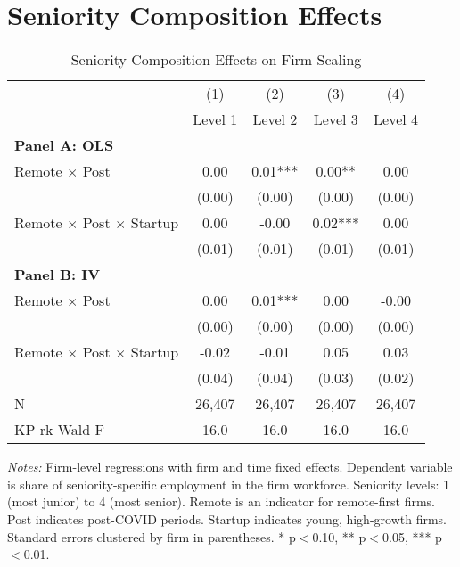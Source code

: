 \documentclass[11pt]{article}
\begin{document}
\section{Seniority Composition Effects}

\begin{table}[H]
\centering
\caption{Seniority Composition Effects on Firm Scaling}
\begin{threeparttable}
\begin{tabular}{lcccc}
\toprule
 & (1) & (2) & (3) & (4) \\
 & Level 1 & Level 2 & Level 3 & Level 4 \\
\midrule
\multicolumn{5}{l}{\textbf{Panel A: OLS}} \\
\addlinespace
Remote $\times$ Post & 0.00 & 0.01*** & 0.00** & 0.00 \\
  & (0.00) & (0.00) & (0.00) & (0.00) \\
\addlinespace[0.5em]
Remote $\times$ Post $\times$ Startup & 0.00 & -0.00 & 0.02*** & 0.00 \\
  & (0.01) & (0.01) & (0.01) & (0.01) \\
\midrule
\multicolumn{5}{l}{\textbf{Panel B: IV}} \\
\addlinespace
Remote $\times$ Post & 0.00 & 0.01*** & 0.00 & -0.00 \\
  & (0.00) & (0.00) & (0.00) & (0.00) \\
\addlinespace[0.5em]
Remote $\times$ Post $\times$ Startup & -0.02 & -0.01 & 0.05 & 0.03 \\
  & (0.04) & (0.04) & (0.03) & (0.02) \\
\midrule
N & 26,407 & 26,407 & 26,407 & 26,407 \\
KP rk Wald F & 16.0 & 16.0 & 16.0 & 16.0 \\
\bottomrule
\end{tabular}
\begin{tablenotes}
\small
\item \textit{Notes:} Firm-level regressions with firm and time fixed effects. 
Dependent variable is share of seniority-specific employment in the firm workforce. 
Seniority levels: 1 (most junior) to 4 (most senior).
Remote is an indicator for remote-first firms. Post indicates post-COVID periods.
Startup indicates young, high-growth firms.
Standard errors clustered by firm in parentheses. 
* p$<$0.10, ** p$<$0.05, *** p$<$0.01.
\end{tablenotes}
\end{threeparttable}
\end{table}
\end{document}
